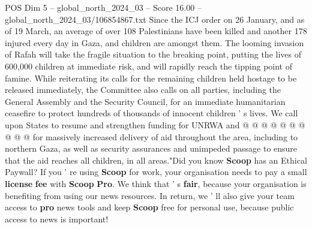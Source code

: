 \begin{textsample}{POS Dim 5 – global\_north\_2024\_03 – Score 16.00 – global\_north\_2024\_03/106854867.txt}
Since the ICJ order on 26 January, and as of 19 March, an average of over 108 Palestinians have been killed and another 178 injured every day in Gaza, and children are amongst them.
The looming invasion of Rafah will take the fragile situation to the breaking point, putting the lives of 600,000 children at immediate risk, and will rapidly reach the tipping point of famine.
While reiterating its calls for the remaining children held hostage to be released immediately, the Committee also calls on all parties, including the General Assembly and the Security Council, for an immediate humanitarian ceasefire to protect hundreds of thousands of innocent children ' s lives.
We call upon States to resume and strengthen funding for UNRWA and @ @ @ @ @ @ @ @ @ @ for massively increased delivery of aid throughout the area, including to northern Gaza, as well as security assurances and unimpeded passage to ensure that the aid reaches all children, in all areas."Did you know \textbf{Scoop} has an Ethical Paywall?
If you ' re using \textbf{Scoop} for work, your organisation needs to pay a small \textbf{license} \textbf{fee} with \textbf{Scoop} \textbf{Pro}.
We think that ' s \textbf{fair}, because your organisation is benefiting from using our news resources.
In return, we ' ll also give your team access to \textbf{pro} news tools and keep \textbf{Scoop} free for personal use, because public access to news is important!

\end{textsample}
